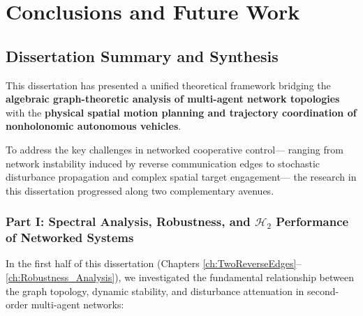 \chapter[Conclusions and Future Work]{Conclusions and Future Work}\label{ch:conclusion}

\section{Dissertation Summary and Synthesis}\label{sec:ch_con_summary}
This dissertation has presented a unified theoretical framework bridging the \textbf{algebraic graph-theoretic analysis of multi-agent network topologies} with the \textbf{physical spatial motion planning and trajectory coordination of nonholonomic autonomous vehicles}. 

To address the key challenges in networked cooperative control— ranging from network instability induced by reverse communication edges to stochastic disturbance propagation and complex spatial target engagement— the research in this dissertation progressed along two complementary avenues.

\subsection{Part I: Spectral Analysis, Robustness, and $\mathcal{H}_2$ Performance of Networked Systems}

In the first half of this dissertation (Chapters \ref{ch:TwoReverseEdges}--\ref{ch:Robustness_Analysis}), we investigated the fundamental relationship between the graph topology, dynamic stability, and disturbance attenuation in second-order multi-agent networks:

